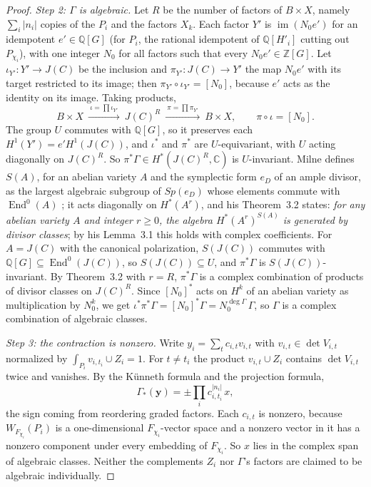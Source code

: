 \documentclass[11pt]{amsart}
\theoremstyle{definition}
\theoremstyle{remark}
\newcommand{\Q}{\mathbb Q}
\newcommand{\Z}{\mathbb Z}
\newcommand{\C}{\mathbb C}
\newcommand{\End}{\operatorname{End}}
\begin{document}
\begin{proof}
\emph{Step 2: $\Gamma$ is algebraic.} Let $R$ be the number of factors of $B\times X$, namely $\sum_i|n_i|$ copies of the $P_i$ and the factors $X_k$. Each factor $Y'$ is $\operatorname{im}(N_0e')$ for an idempotent $e'\in\Q[G]$ (for $P_i$, the rational idempotent of $\Q[H'_i]$ cutting out $P_{\chi_i}$), with one integer $N_0$ for all factors such that every $N_0e'\in\Z[G]$. Let $\iota_{Y'}\colon Y'\to J(C)$ be the inclusion and $\pi_{Y'}\colon J(C)\to Y'$ the map $N_0e'$ with its target restricted to its image; then $\pi_{Y'}\circ\iota_{Y'}=[N_0]$, because $e'$ acts as the identity on its image. Taking products,
\[
B\times X\ \xrightarrow{\ \iota=\prod\iota_{Y'}\ }\ J(C)^R\ \xrightarrow{\ \pi=\prod\pi_{Y'}\ }\ B\times X,\qquad \pi\circ\iota=[N_0].
\]
The group $U$ commutes with $\Q[G]$, so it preserves each $H^1(Y')=e'H^1(J(C))$, and $\iota^*$ and $\pi^*$ are $U$-equivariant, with $U$ acting diagonally on $J(C)^R$. So $\pi^*\Gamma\in H^*(J(C)^R,\C)$ is $U$-invariant. Milne defines $S(A)$, for an abelian variety $A$ and the symplectic form $e_D$ of an ample divisor, as the largest algebraic subgroup of $Sp(e_D)$ whose elements commute with $\End^0(A)$ \cite[\S1]{Milne}; it acts diagonally on $H^*(A^r)$, and his Theorem~3.2 states: \emph{for any abelian variety $A$ and integer $r\ge0$, the algebra $H^*(A^r)^{S(A)}$ is generated by divisor classes}; by his Lemma~3.1 this holds with complex coefficients. For $A=J(C)$ with the canonical polarization, $S(J(C))$ commutes with $\Q[G]\subseteq\End^0(J(C))$, so $S(J(C))\subseteq U$, and $\pi^*\Gamma$ is $S(J(C))$-invariant. By Theorem~3.2 with $r=R$, $\pi^*\Gamma$ is a complex combination of products of divisor classes on $J(C)^R$. Since $[N_0]^*$ acts on $H^k$ of an abelian variety as multiplication by $N_0^k$, we get $\iota^*\pi^*\Gamma=[N_0]^*\Gamma=N_0^{\deg\Gamma}\,\Gamma$, so $\Gamma$ is a complex combination of algebraic classes.

\emph{Step 3: the contraction is nonzero.} Write $y_i=\sum_tc_{i,t}v_{i,t}$ with $v_{i,t}\in\det V_{i,t}$ normalized by $\int_{P_i}v_{i,t_i}\cup Z_i=1$. For $t\ne t_i$ the product $v_{i,t}\cup Z_i$ contains $\det V_{i,t}$ twice and vanishes. By the K\"unneth formula and the projection formula,
\[
\Gamma_*(\mathbf y)=\pm\textstyle\prod_ic_{i,t_i}^{|n_i|}\,x ,
\]
the sign coming from reordering graded factors. Each $c_{i,t}$ is nonzero, because $W_{F_{\chi_i}}(P_i)$ is a one-dimensional $F_{\chi_i}$-vector space and a nonzero vector in it has a nonzero component under every embedding of $F_{\chi_i}$. So $x$ lies in the complex span of algebraic classes. Neither the complements $Z_i$ nor $\Gamma$'s factors are claimed to be algebraic individually.
\end{proof}
\end{document}
